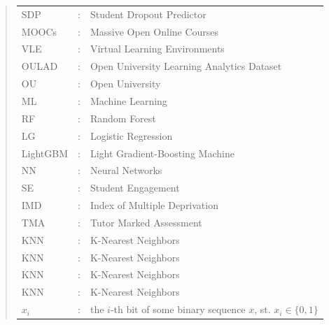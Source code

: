 \documentclass[ %
                    author={Carlos Duran Calle},
                supervisor={Dr. Felipe Campelo},
                    degree={MSc},
                     title={Comparative Machine Learning Analysis for Student Dropout Prediction in a Virtual Learning Environment},
                  subtitle={Incorporating Student Engagement and Socio-Economic Features},
                      type={},
                      year={2025}]{dissertation}
\begin{document}
\vspace{1cm} 

%

\begin{quote}
\noindent
\begin{tabular}{lcl}
SDP                 &:     & Student Dropout Predictor	\\
MOOCs               &:     & Massive Open Online Courses	\\
VLE                 &:     & Virtual Learning Environments	\\
OULAD               &:     & Open University Learning Analytics Dataset	\\
OU                  &:     & Open University	\\
ML                  &:     & Machine Learning	\\
RF                  &:     & Random Forest	\\
LG                  &:     & Logistic Regression	\\
LightGBM            &:     & Light Gradient-Boosting Machine	\\
NN                  &:     & Neural Networks	\\
SE                  &:     & Student Engagement	\\
IMD                 &:     & Index of Multiple Deprivation	\\
TMA                 &:     & Tutor Marked Assessment	\\
KNN                 &:     & K-Nearest Neighbors	\\
KNN                 &:     & K-Nearest Neighbors	\\
KNN                 &:     & K-Nearest Neighbors	\\
KNN                 &:     & K-Nearest Neighbors	\\
$x_i$               &:     & the $i$-th bit of some binary sequence $x$, st. $x_i \in \{ 0, 1 \}$ \\
\end{tabular}
\end{quote}
\end{document}
